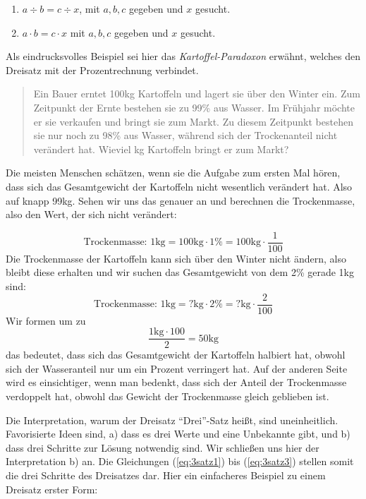 \begin{enumerate}
\item $a\div b = c\div x$, mit $a,b,c$ gegeben und $x$ gesucht.
\item $a\cdot b = c\cdot x$ mit $a,b,c$ gegeben und $x$ gesucht.
\end{enumerate}

Als eindrucksvolles Beispiel sei hier das \textsl{Kartoffel-Paradoxon} erwähnt, welches den Dreisatz mit der Prozentrechnung verbindet. 

\begin{quote}
Ein Bauer erntet 100kg Kartoffeln und lagert sie über den Winter ein. Zum Zeitpunkt der Ernte bestehen sie zu 99\% aus Wasser. Im Frühjahr möchte er sie verkaufen und bringt sie zum Markt. Zu diesem Zeitpunkt bestehen sie nur noch zu 98\% aus Wasser, während sich der Trockenanteil nicht verändert hat. Wieviel kg Kartoffeln bringt er zum Markt?
\end{quote}

Die meisten Menschen schätzen, wenn sie die Aufgabe zum ersten Mal hören, dass sich das Gesamtgewicht der Kartoffeln nicht wesentlich verändert hat. Also auf knapp 99kg. Sehen wir uns das genauer an und berechnen die Trockenmasse, also den Wert, der sich nicht verändert:

\begin{equation}\label{eq:3satz1}
\text{Trockenmasse: } 1\text{kg} = 100\text{kg} \cdot 1\% = 100\text{kg} \cdot \frac{1}{100}
\end{equation}
Die Trockenmasse der Kartoffeln kann sich über den Winter nicht ändern, also bleibt diese erhalten und wir suchen das Gesamtgewicht von dem 2\% gerade 1kg sind:
\begin{equation}
\text{Trockenmasse: } 1\text{kg} = ?\text{kg} \cdot 2\% = ?\text{kg} \cdot \frac{2}{100}
\end{equation}
Wir formen um zu 
\begin{equation}\label{eq:3satz3}
\frac{1\text{kg}\cdot 100}{2} = 50\text{kg}
\end{equation}
das bedeutet, dass sich das Gesamtgewicht der Kartoffeln halbiert hat, obwohl sich der Wasseranteil nur um ein Prozent verringert hat. Auf der anderen Seite wird es einsichtiger, wenn man bedenkt, dass sich der Anteil der Trockenmasse verdoppelt hat, obwohl das Gewicht der Trockenmasse gleich geblieben ist.

Die Interpretation, warum der Dreisatz "`Drei"'-Satz heißt, sind uneinheitlich. Favorisierte Ideen sind, a) dass es drei Werte und eine Unbekannte gibt, und b) dass drei Schritte zur Lösung notwendig sind. Wir schließen uns hier der Interpretation b) an. Die Gleichungen (\ref{eq:3satz1}) bis (\ref{eq:3satz3}) stellen somit die drei Schritte des Dreisatzes dar. Hier ein einfacheres Beispiel zu einem Dreisatz erster Form:

